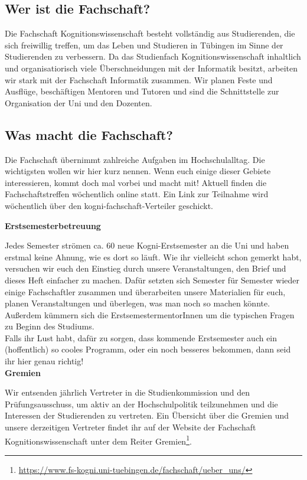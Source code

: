 \subsection{Wer ist die Fachschaft?}
Die Fachschaft Kognitionswissenschaft besteht vollständig aus Studierenden, die sich freiwillig treffen, um das Leben und Studieren in Tübingen im Sinne der Studierenden zu verbessern. Da das Studienfach Kognitionswissenschaft inhaltlich und organisatiorisch viele Überschneidungen mit der Informatik besitzt, arbeiten wir stark mit der Fachschaft Informatik zusammen.
Wir planen Feste und Ausflüge, beschäftigen Mentoren und Tutoren und sind die Schnittstelle zur Organisation der Uni und den Dozenten.

\subsection{Was macht die Fachschaft?}
Die Fachschaft übernimmt zahlreiche Aufgaben im Hochschulalltag. Die wichtigsten wollen wir hier kurz nennen. Wenn euch einige dieser Gebiete interessieren, kommt doch mal vorbei und macht mit! Aktuell finden die Fachschaftstreffen wöchentlich online statt. Ein Link zur Teilnahme wird wöchentlich über den kogni-fachschaft-Verteiler geschickt.

\textbf{Erstsemesterbetreuung}

Jedes Semester strömen ca. 60 neue Kogni-Erstsemester an die Uni und haben erstmal keine Ahnung, wie es dort so läuft. Wie ihr vielleicht schon gemerkt habt, versuchen wir euch den Einstieg durch unsere Veranstaltungen, den Brief und dieses Heft einfacher zu machen. Dafür setzten sich Semester für Semester wieder einige Fachschaftler zusammen und überarbeiten unsere Materialien für euch, planen Veranstaltungen und überlegen, was man noch so machen könnte. Außerdem kümmern sich die ErstsemestermentorInnen um die typischen Fragen zu Beginn des Studiums.\\
Falls ihr Lust habt, dafür zu sorgen, dass kommende Erstsemester auch ein (hoffentlich) so cooles Programm, oder ein noch besseres bekommen, dann seid ihr hier genau richtig!\\

\textbf{Gremien}

Wir entsenden jährlich Vertreter in die Studienkommission und den Prüfungsausschuss, um aktiv an der Hochschulpolitik teilzunehmen und die Interessen der Studierenden zu vertreten. Ein Übersicht über die Gremien und unsere derzeitigen Vertreter findet ihr auf der Website der Fachschaft Kognitionswissenschaft unter dem Reiter Gremien\footnote{\url{https://www.fs-kogni.uni-tuebingen.de/fachschaft/ueber_uns/}}. \\	%

